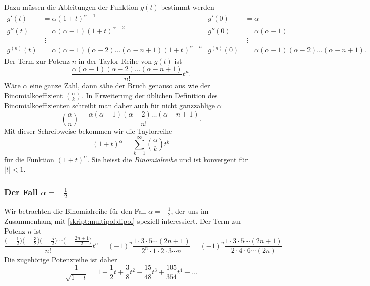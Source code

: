 Dazu müssen die Ableitungen der Funktion $g(t)$ bestimmt werden
\begin{align*}
g'(t)
&=
\alpha(1+t)^{\alpha-1}
&
g'(0)&=\alpha
\\
g''(t)
&=
\alpha(\alpha-1)(1+t)^{\alpha-2}
&
g''(0)&=\alpha(\alpha-1)
\\
&\;\vdots
&
&\;\vdots
\\
g^{(n)}(t)
&=
\alpha(\alpha-1)(\alpha-2)\dots(\alpha-n+1) (1+t)^{\alpha -n}
&
g^{(n)}(0)&=\alpha(\alpha-1)(\alpha-2)\dots(\alpha -n +1).
\end{align*}
Der Term zur Potenz $n$ in der Taylor-Reihe von $g(t)$ ist
\[
\frac{\alpha(\alpha-1)(\alpha-2)\dots(\alpha-n+1)}{n!} t^n.
\]
Wäre $\alpha$ eine ganze Zahl, dann sähe der Bruch
genauso aus wie der Binomialkoeffizient $\binom{\alpha}{k}$.
In Erweiterung der üblichen Definition des Binomialkoeffizienten
schreibt man daher auch für nicht ganzzahlige $\alpha$
\[
\binom{\alpha}{n}
=
\frac{\alpha(\alpha-1)(\alpha-2)\dots(\alpha-n+1)}{n!}.
\]
Mit dieser Schreibweise bekommen wir die Taylorreihe
\[
(1+t)^\alpha=\sum_{k=1}^\infty \binom{\alpha}{k} t^k
\]
für die Funktion $(1+t)^\alpha$.
Sie heisst die {\em Binomialreihe} und ist konvergent für $|t|<1$.
%

\subsubsection{Der Fall $\alpha=-\frac12$}
Wir betrachten die Binomialreihe für den Fall $\alpha=-\frac12$, der
uns im Zusammenhang mit \eqref{skript:multipol:dipol} speziell
interessiert.
Der Term zur Potenz $n$ ist
\begin{equation}
\frac{
\bigl(-\frac12\bigr)
\bigl(-\frac32\bigr)
\bigl(-\frac52\bigr)
\cdots
\bigl(-\frac{2n+1}2\bigr)}{n!} t^n
=
(-1)^n \frac{1\cdot 3\cdot 5 \cdots (2n + 1)}{2^n\cdot 1\cdot 2\cdot 3\cdots n}
=
(-1)^n \frac{1\cdot 3\cdot 5 \cdots (2n+1)}{2\cdot 4\cdot 6\cdots (2n)}
\label{skript:multipol:koeffizienten}
\end{equation}
Die zugehörige Potenzreihe ist daher
\[
\frac1{\sqrt{1+t}}
=
1-\frac12t+\frac3{8}t^2-\frac{15}{48}t^3+\frac{105}{354}t^4-\dots
\]

